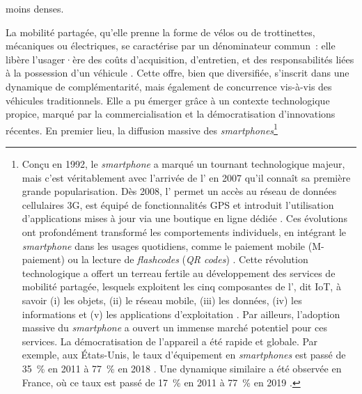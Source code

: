 \begin{refsegment}
moins denses.%

La mobilité partagée, qu’elle prenne la forme de vélos ou de trottinettes, mécaniques ou électriques, se caractérise par un dénominateur commun~: elle libère l’usager·ère des coûts d’acquisition, d’entretien, et des responsabilités liées à la possession d’un véhicule \textcolor{blue}{\autocite[44]{mathew_analysis_2019}}. Cette offre, bien que diversifiée, s’inscrit dans une dynamique de complémentarité, mais également de concurrence vis-à-vis des véhicules traditionnels. Elle a pu émerger grâce à un contexte technologique propice, marqué par la commercialisation et la démocratisation d’innovations récentes. En premier lieu, la diffusion massive des \textsl{smartphones}\footnote{
    Conçu en 1992, le \textsl{smartphone} a marqué un tournant technologique majeur, mais c’est véritablement avec l’arrivée de l’ en 2007 qu’il connaît sa première grande popularisation. Dès 2008, l’ permet un accès au réseau de données cellulaires 3G, est équipé de fonctionnalités \acrshort{GPS} et introduit l’utilisation d’applications mises à jour via une boutique en ligne dédiée \textcolor{blue}{\autocite{les_numeriques_2007_2014}}. Ces évolutions ont profondément transformé les comportements individuels, en intégrant le \textsl{smartphone} dans les usages quotidiens, comme le paiement mobile (M-paiement) ou la lecture de \textsl{flashcodes} (\textsl{QR codes}) \textcolor{blue}{\autocites[279]{chaix_paiement_2013}[21]{ben_jaddi_m-paiement_2018}}. Cette révolution technologique a offert un terreau fertile au développement des services de mobilité partagée, lesquels exploitent les cinq composantes de l’, dit \acrfull{IoT}, à savoir (i) les objets, (ii) le réseau mobile, (iii) les données, (iv) les informations et (v) les applications d'exploitation \textcolor{blue}{\autocite{iot_evolution_world_impact_2017}}. Par ailleurs, l’adoption massive du \textsl{smartphone} a ouvert un immense marché potentiel pour ces services. La démocratisation de l’appareil a été rapide et globale. Par exemple, aux États-Unis, le taux d’équipement en \textsl{smartphones} est passé de 35~\% en 2011 à 77~\% en 2018 \textcolor{blue}{\autocite[8]{clewlow_micro-mobility_2018}}. Une dynamique similaire a été observée en France, où ce taux est passé de 17~\% en 2011 à 77~\% en 2019 \textcolor{blue}{\autocite[28]{credoc_barometre_2019}}.
}
\end{refsegment}
